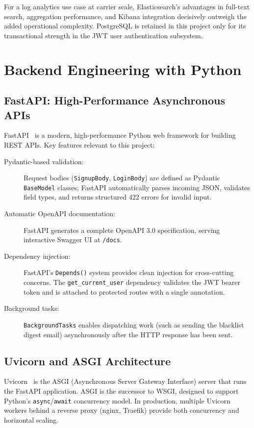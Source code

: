 \documentclass[12pt,a4paper,oneside]{report}
\begin{document}
For a log analytics use case at carrier scale, Elasticsearch's advantages in full-text search, aggregation performance, and Kibana integration decisively outweigh the added operational complexity.
PostgreSQL is retained in this project only for its transactional strength in the JWT user authentication subsystem.

\section{Backend Engineering with Python}

\subsection{FastAPI: High-Performance Asynchronous APIs}

FastAPI~\cite{fastapiDocs} is a modern, high-performance Python web framework for building REST APIs.
Key features relevant to this project:

\begin{description}
  \item[Pydantic-based validation:] Request bodies (\texttt{SignupBody}, \texttt{LoginBody}) are defined as Pydantic \texttt{BaseModel} classes; FastAPI automatically parses incoming JSON, validates field types, and returns structured 422 errors for invalid input.
  \item[Automatic OpenAPI documentation:] FastAPI generates a complete OpenAPI 3.0 specification, serving interactive Swagger UI at \texttt{/docs}.
  \item[Dependency injection:] FastAPI's \texttt{Depends()} system provides clean injection for cross-cutting concerns. The \texttt{get\_current\_user} dependency validates the JWT bearer token and is attached to protected routes with a single annotation.
  \item[Background tasks:] \texttt{BackgroundTasks} enables dispatching work (such as sending the blacklist digest email) asynchronously after the HTTP response has been sent.
\end{description}

\subsection{Uvicorn and ASGI Architecture}

Uvicorn~\cite{uvicornDocs} is the ASGI (Asynchronous Server Gateway Interface) server that runs the FastAPI application.
ASGI is the successor to WSGI, designed to support Python's \texttt{async}/\texttt{await} concurrency model.
In production, multiple Uvicorn workers behind a reverse proxy (nginx, Traefik) provide both concurrency and horizontal scaling.
\end{document}
